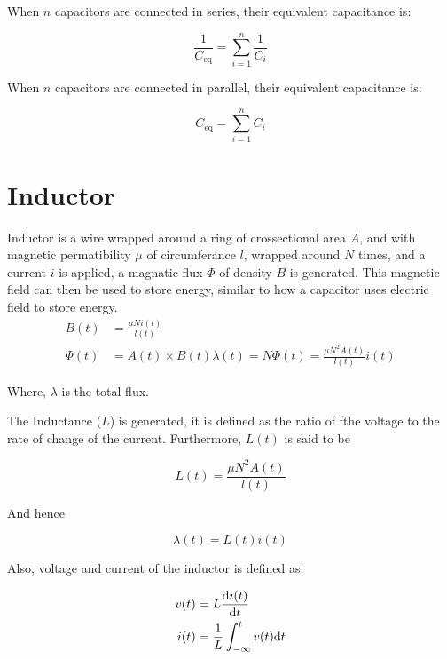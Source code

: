 \documentclass[11pt,a4paper]{book}
\begin{document}
When $n$ capacitors are connected in series, their equivalent capacitance is:

\begin{equation}
\frac{1}{C_{\text{eq}}} = \sum_{i = 1}^{n} \frac{1}{C_i}
\end{equation}

When $n$ capacitors are connected in parallel, their equivalent capacitance is:

\begin{equation}
C_{\text{eq}} = \sum_{i = 1}^n C_i
\end{equation}

\section{Inductor}

Inductor is a wire wrapped around a ring of crossectional area $A$, and with magnetic permatibility $\mu$ of circumferance $l$, wrapped around $N$ times, and a current $i$ is applied, a magnatic flux $\Phi$ of density $B$ is generated. This magnetic field can then be used to store energy, similar to how a capacitor uses electric field to store energy.\\

\begin{align*}
B(t) &= \frac{\mu N i(t)}{l(t)}\\
\Phi(t) &= A(t) \times B(t)
\lambda(t) = N \Phi(t) = \frac{\mu N^2 A(t)}{l(t)} i(t)
\end{align*}

Where, $\lambda$ is the total flux.

The Inductance ($L$) is generated, it is defined as the ratio of fthe voltage to the rate of change of the current. Furthermore, $L(t)$ is said to be

\begin{equation}
L(t) = \frac{\mu N^2 A(t)}{l(t)}
\end{equation}

And hence

\begin{equation}
\lambda(t) = L(t) i(t)
\end{equation}

Also, voltage and current of the inductor is defined as:

\begin{align}
v(t) &= L \frac{\text{d} i(t)}{\text{d} t}\\
i(t) &= \frac{1}{L} \int_{- \infty}^{t} v(t) \text{d} t
\end{align}
\end{document}
